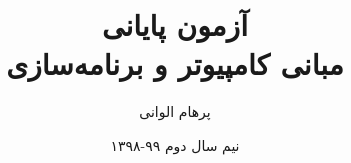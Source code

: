 \documentclass[]{article}
\title{آزمون پایانی\\مبانی کامپیوتر و برنامه‌سازی}
\author{پرهام الوانی}
\date{نیم سال دوم ۹۹-۱۳۹۸}
\begin{document}
    \maketitle

    
    \pagebreak
    
    \pagebreak
    
    \pagebreak
    
    \pagebreak
    
\end{document}
